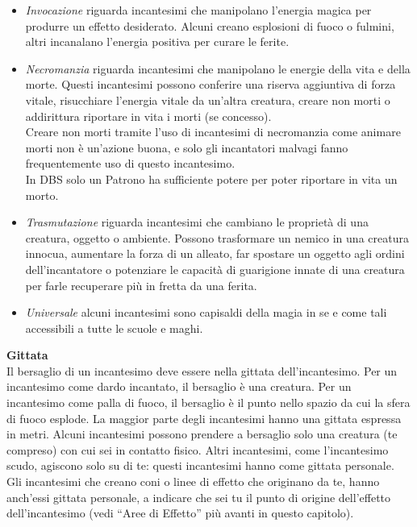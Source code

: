 \begin{itemize}
\item
\textit{Invocazione} riguarda incantesimi che manipolano l’energia  magica per produrre un effetto desiderato. Alcuni creano  esplosioni di fuoco o fulmini, altri incanalano l’energia positiva  per curare le ferite.\\
\item
\textit{Necromanzia} riguarda incantesimi che manipolano le energie della vita e della morte. Questi incantesimi possono conferire una riserva aggiuntiva di forza vitale, risucchiare l’energia vitale da un'altra creatura, creare non morti o addirittura riportare in vita i morti (se concesso).\\
Creare non morti tramite l’uso di incantesimi di necromanzia come animare morti non è un'azione buona, e solo gli incantatori malvagi fanno frequentemente uso di questo incantesimo.\\
In DBS solo un Patrono ha sufficiente potere per poter riportare in vita un morto.\\
\item
\textit{Trasmutazione} riguarda incantesimi che cambiano le proprietà di una creatura, oggetto o ambiente. Possono trasformare un  nemico in una creatura innocua, aumentare la forza di un alleato,  far spostare un oggetto agli ordini dell'incantatore o potenziare le  capacità di guarigione innate di una creatura per farle recuperare  più in fretta da una ferita.\\
\item
\textit{Universale} alcuni incantesimi sono capisaldi della magia in se e come tali accessibili a tutte le scuole e maghi.


\end{itemize}

\textbf{Gittata}\\
Il bersaglio di un incantesimo deve essere nella gittata dell'incantesimo. Per un incantesimo come dardo  incantato, il bersaglio è una creatura. Per un incantesimo come palla di fuoco, il bersaglio è il punto  nello spazio da cui la sfera di fuoco esplode. La maggior parte degli incantesimi hanno una gittata espressa in metri. Alcuni incantesimi possono prendere a bersaglio solo una creatura (te compreso) con cui sei  in contatto fisico. Altri incantesimi, come l'incantesimo  scudo, agiscono solo su di te: questi incantesimi hanno come gittata personale.
\\
Gli incantesimi che creano coni o linee di effetto che originano da te, hanno anch’essi gittata personale, a indicare che sei tu il punto di origine dell'effetto dell'incantesimo (vedi “Aree di Effetto” più avanti in questo capitolo).\\

